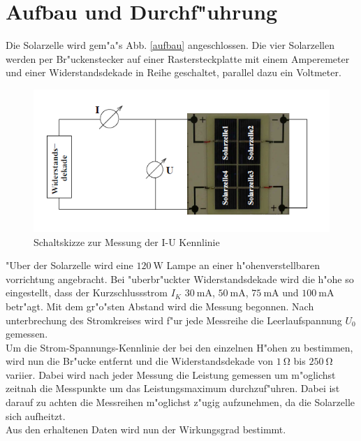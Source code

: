 \section{Aufbau und Durchf"uhrung}
	\label{sec:durchfuehrung}

	Die Solarzelle wird gem"a"s Abb. \eqref{aufbau} angeschlossen.
	Die vier Solarzellen werden per Br"uckenstecker auf einer Rastersteckplatte mit einem  Amperemeter und einer Widerstandsdekade in Reihe geschaltet, parallel dazu ein Voltmeter.

	\begin{figure}[htbp]
		\centering
		\includegraphics[width = 12cm]{img/aufbau.PNG}
		\caption{Schaltskizze zur Messung der I-U Kennlinie}
		\label{aufbau}
	\end{figure}

	"Uber der Solarzelle wird eine $\SI{120}{\watt}$ Lampe an einer h"ohenverstellbaren vorrichtung angebracht.
	Bei "uberbr"uckter Widerstandsdekade wird die h"ohe so eingestellt, dass der Kurzschlussstrom $I_K$ $\SI{30}{\milli\ampere}$, $\SI{50}{\milli\ampere}$, $\SI{75}{\milli\ampere}$ und $\SI{100}{\milli\ampere}$ betr"agt.
	Mit dem gr"o"sten Abstand wird die Messung begonnen.
	Nach unterbrechung des Stromkreises wird f"ur jede Messreihe die Leerlaufspannung $U_0$ gemessen.\\
	Um die Strom-Spannungs-Kennlinie der bei den einzelnen H"ohen zu bestimmen, wird nun die Br"ucke entfernt und die Widerstandsdekade von $\SI{1}{\ohm}$ bis $\SI{250}{\ohm}$ variier.
	Dabei wird nach jeder Messung die Leistung gemessen um m"oglichst zeitnah die Messpunkte um das Leistungsmaximum durchzuf"uhren.
	Dabei ist darauf zu achten die Messreihen m"oglichst z"ugig aufzunehmen, da die Solarzelle sich aufheitzt.\\
	Aus den erhaltenen Daten wird nun der Wirkungsgrad bestimmt.